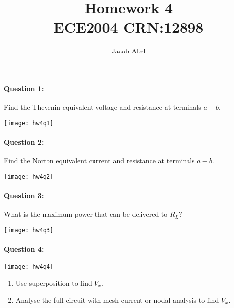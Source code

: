 \documentclass[12pt,letterpaper,titlepage]{article}
\author{Jacob Abel}
\title{	Homework 4
	\\\large ECE2004 CRN:12898
}
\begin{document}
\maketitle
\begin{raggedright}

\paragraph{Question 1: }

Find the Thevenin equivalent voltage and resistance at terminals $a-b$.

\begin{center}
\texttt{[image: hw4q1]}
\end{center}


\clearpage

\paragraph{Question 2: }

Find the Norton equivalent current and resistance at terminals $a-b$.

\begin{center}
\texttt{[image: hw4q2]}
\end{center}


\clearpage

\paragraph{Question 3: }

What is the maximum power that can be delivered to $R_L$?

\begin{center}
\texttt{[image: hw4q3]}
\end{center}


\clearpage

\paragraph{Question 4: }

\begin{center}
\texttt{[image: hw4q4]}
\end{center}

\begin{enumerate}[label=\Alph*)]
\item Use superposition to find $V_x$.
\item Analyse the full circuit with mesh current or nodal analysis to find $V_x$.
\end{enumerate}

\end{raggedright}
\end{document}
